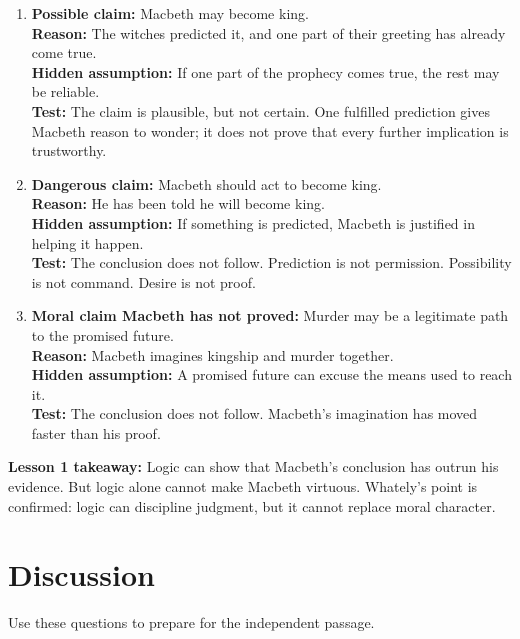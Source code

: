 \documentclass[12pt]{article}
\newcommand{\focusbox}[1]{\par\vspace{0.35em}\noindent\begingroup\setlength{\fboxsep}{6pt}\colorbox{gray!12}{\begin{minipage}{\dimexpr\linewidth-2\fboxsep\relax}#1\end{minipage}}\endgroup\par\vspace{0.45em}}
\begin{document}
\begin{enumerate}[leftmargin=*]
\item \textbf{Possible claim:} Macbeth may become king.\\
\textbf{Reason:} The witches predicted it, and one part of their greeting has already come true.\\
\textbf{Hidden assumption:} If one part of the prophecy comes true, the rest may be reliable.\\
\textbf{Test:} The claim is plausible, but not certain. One fulfilled prediction gives Macbeth reason to wonder; it does not prove that every further implication is trustworthy.

\item \textbf{Dangerous claim:} Macbeth should act to become king.\\
\textbf{Reason:} He has been told he will become king.\\
\textbf{Hidden assumption:} If something is predicted, Macbeth is justified in helping it happen.\\
\textbf{Test:} The conclusion does not follow. Prediction is not permission. Possibility is not command. Desire is not proof.

\item \textbf{Moral claim Macbeth has not proved:} Murder may be a legitimate path to the promised future.\\
\textbf{Reason:} Macbeth imagines kingship and murder together.\\
\textbf{Hidden assumption:} A promised future can excuse the means used to reach it.\\
\textbf{Test:} The conclusion does not follow. Macbeth's imagination has moved faster than his proof.
\end{enumerate}

\focusbox{\textbf{Lesson 1 takeaway:} Logic can show that Macbeth's conclusion has outrun his evidence. But logic alone cannot make Macbeth virtuous. Whately's point is confirmed: logic can discipline judgment, but it cannot replace moral character.}

\section*{Discussion}
Use these questions to prepare for the independent passage.
\end{document}
